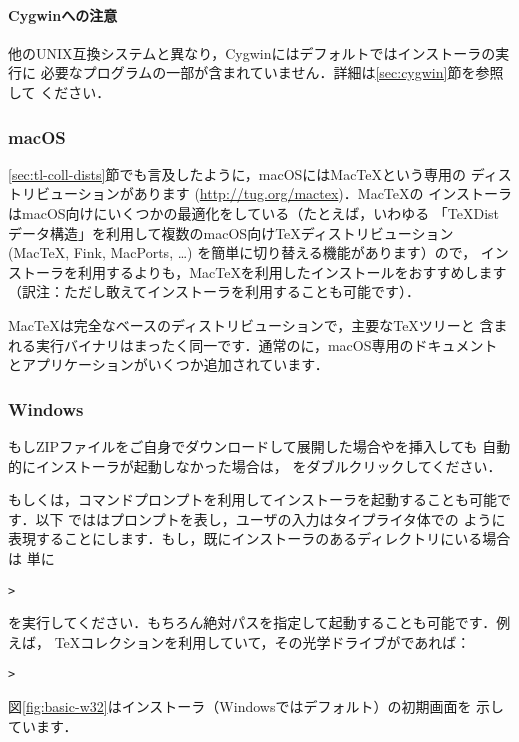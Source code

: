 \documentclass[uplatex,dvipdfmx]{jsarticle}
\begin{document}
\paragraph{Cygwinへの注意}
他のUNIX互換システムと異なり，Cygwinにはデフォルトでは\TL インストーラの実行に
必要なプログラムの一部が含まれていません．詳細は\ref{sec:cygwin}節を参照して
ください．

\subsubsection{macOS}
\label{sec:macos}

\ref{sec:tl-coll-dists}節でも言及したように，macOSにはMac\TeX という専用の
ディストリビューションがあります (\url{http://tug.org/mactex})．Mac\TeX の
インストーラはmacOS向けにいくつかの最適化をしている（たとえば，いわゆる
「{\TeX}Distデータ構造」を利用して複数のmacOS向け\TeX ディストリビューション
(Mac\TeX, Fink, MacPorts, \ldots) を簡単に切り替える機能があります）ので，\TL
インストーラを利用するよりも，Mac\TeX を利用したインストールをおすすめします
（訳注：ただし敢えて\TL インストーラを利用することも可能です）．

Mac\TeX は完全な\TL ベースのディストリビューションで，主要な\TeX ツリーと
含まれる実行バイナリはまったく同一です．通常の\TL に，macOS専用のドキュメント
とアプリケーションがいくつか追加されています．

\subsubsection{Windows}\label{sec:wininst}

もしZIPファイルをご自身でダウンロードして展開した場合や\DVD を挿入しても
自動的にインストーラが起動しなかった場合は，%
をダブルクリックしてください．

もしくは，コマンドプロンプトを利用してインストーラを起動することも可能です．以下
では\code{>}はプロンプトを表し，ユーザの入力はタイプライタ体での
ように表現することにします．もし，既にインストーラのあるディレクトリにいる場合は
単に
%
\begin{alltt}
> 
\end{alltt}
%
を実行してください．もちろん絶対パスを指定して起動することも可能です．例えば，
\TeX コレクション\DVD を利用していて，その光学ドライブがであれば：
%
\begin{alltt}
> 
\end{alltt}
%
図\ref{fig:basic-w32}は\GUI インストーラ（Windowsではデフォルト）の初期画面を
示しています．
\end{document}
